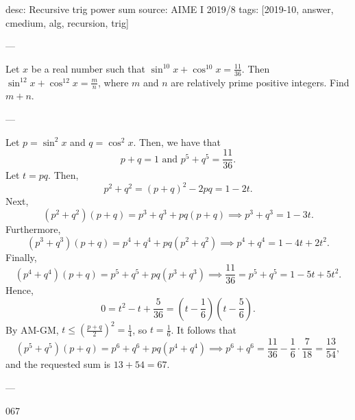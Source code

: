 desc: Recursive trig power sum
source: AIME I 2019/8
tags: [2019-10, answer, cmedium, alg, recursion, trig]

---

Let $x$ be a real number such that $\sin^{10}x+\cos^{10}x=\tfrac{11}{36}$. Then $\sin^{12}x+\cos^{12}x=\tfrac mn$, where $m$ and $n$ are relatively prime positive integers. Find $m+n$.

---

Let $p=\sin^2 x$ and $q=\cos^2 x$. Then, we have that \[p+q=1\text{ and }p^5+q^5=\frac{11}{36}.\]
Let $t=pq$. Then, \[p^2+q^2=(p+q)^2-2pq=1-2t.\]
Next, \[(p^2+q^2)(p+q)=p^3+q^3+pq(p+q)\implies p^3+q^3=1-3t.\]
Furthermore, \[(p^3+q^3)(p+q)=p^4+q^4+pq(p^2+q^2)\implies p^4+q^4=1-4t+2t^2.\]
Finally, \[(p^4+q^4)(p+q)=p^5+q^5+pq(p^3+q^3)\implies \frac{11}{36}=p^5+q^5=1-5t+5t^2.\]
Hence, \[0=t^2-t+\frac{5}{36}=\left(t-\frac16\right)\left(t-\frac56\right).\]
By AM-GM, $t\le (\tfrac{p+q}2)^2=\tfrac 14$, so $t=\tfrac 16$. It follows that \[(p^5+q^5)(p+q)=p^6+q^6+pq(p^4+q^4)\implies p^6+q^6=\frac{11}{36}-\frac16\cdot\frac7{18}=\frac{13}{54},\]
and the requested sum is $13+54=67$.

---

067
